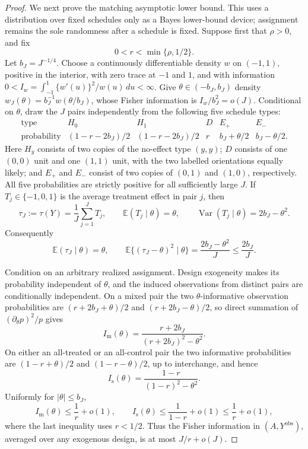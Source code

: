 \documentclass{article}
\begin{document}
\begin{proof}
We next prove the matching asymptotic lower bound.  This uses a distribution over fixed schedules only as a Bayes lower-bound device; assignment remains the sole randomness after a schedule is fixed.  Suppose first that \(\rho>0\), and fix
\[
 0<r<\min\{\rho,1/2\}.
\]
Let \(b_J=J^{-1/4}\).  Choose a continuously differentiable density \(w\) on \((-1,1)\), positive in the interior, with zero trace at \(-1\) and \(1\), and with information
\(
 0<I_w=\int_{-1}^1\{w'(u)\}^2/w(u)\,du<\infty
\).
Give \(\theta\in(-b_J,b_J)\) density
\(
 w_J(\theta)=b_J^{-1}w(\theta/b_J)
\), whose Fisher information is \(I_w/b_J^2=o(J)\).
Conditional on \(\theta\), draw the \(J\) pairs independently from the following five schedule types:
\[
\begin{array}{c|ccccc}
\text{type}&H_0&H_1&D&E_+&E_-\\ \hline
\text{probability}
 &(1-r-2b_J)/2&(1-r-2b_J)/2&r
 &b_J+\theta/2&b_J-\theta/2.
\end{array}
\]
Here \(H_y\) consists of two copies of the no-effect type \((y,y)\); \(D\) consists of one \((0,0)\) unit and one \((1,1)\) unit, with the two labelled orientations equally likely; and \(E_+\) and \(E_-\) consist of two copies of \((0,1)\) and \((1,0)\), respectively.  All five probabilities are strictly positive for all sufficiently large \(J\).  If \(T_j\in\{-1,0,1\}\) is the average treatment effect in pair \(j\), then
\[
 \tau_J:=\tau(Y)=\frac1J\sum_{j=1}^J T_j,
 \qquad
 \mathbb E(T_j\mid\theta)=\theta,
 \qquad
 \operatorname{Var}(T_j\mid\theta)=2b_J-\theta^2.
\]
Consequently
\[
 \mathbb E(\tau_J\mid\theta)=\theta,
 \qquad
 \mathbb E\{(\tau_J-\theta)^2\mid\theta\}
 =\frac{2b_J-\theta^2}{J}\le\frac{2b_J}{J}.
 \tag{2}
\]

Condition on an arbitrary realized assignment.  Design exogeneity makes its probability independent of \(\theta\), and the induced observations from distinct pairs are conditionally independent.  On a mixed pair the two \(\theta\)-informative observation probabilities are
\(
 (r+2b_J+\theta)/2
\) and
\(
 (r+2b_J-\theta)/2
\), so direct summation of \((\partial_\theta p)^2/p\) gives
\[
 I_{\mathrm m}(\theta)
 =\frac{r+2b_J}{(r+2b_J)^2-\theta^2}.
\]
On either an all-treated or an all-control pair the two informative probabilities are
\(
 (1-r+\theta)/2
\) and
\(
 (1-r-\theta)/2
\), up to interchange, and hence
\[
 I_{\mathrm s}(\theta)
 =\frac{1-r}{(1-r)^2-\theta^2}.
\]
Uniformly for \(|\theta|\le b_J\),
\[
 I_{\mathrm m}(\theta)\le \frac1r+o(1),
 \qquad
 I_{\mathrm s}(\theta)\le\frac1{1-r}+o(1)
 \le\frac1r+o(1),
 \tag{3}
\]
where the last inequality uses \(r<1/2\).  Thus the Fisher information in \((A,Y^{\mathrm{obs}})\), averaged over any exogenous design, is at most \(J/r+o(J)\).


\end{proof}
\end{document}
